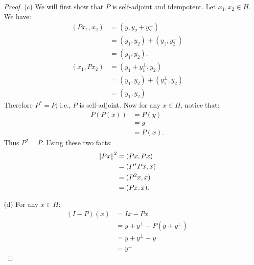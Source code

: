 \begin{proof}
        (c) We will first show that $P$ is self-adjoint and idempotent. Let $x_1,x_2 \in H$. We have:
            \begin{equation*}
            \begin{split}
                (Px_1,x_2)
                & = (y,y_2 + y_2^\perp) \\
                & = (y_1,y_2) + (y_1,y_2^\perp) \\
                & = (y_1,y_2). 
            \end{split}
            \end{equation*}
            \begin{equation*}
            \begin{split}
                (x_1,Px_2)
                & = (y_1 + y_1^\perp , y_2) \\
                & = (y_1,y_2) + (y_1^\perp, y_2) \\
                & = (y_1,y_2).
            \end{split}
            \end{equation*}
        Therefore $P^\ast = P$; i.e., $P$ is self-adjoint. Now for any $x \in H$, notice that:
            \begin{equation*}
            \begin{split}
                P(P(x))
                & = P(y) \\
                & = y \\
                & = P(x).
            \end{split}
            \end{equation*}
        Thus $P^2 = P$. Using these two facts:
            \begin{equation*}
            \begin{split}
                \left\lVert Px \right\rVert^2 
                & = (Px,Px) \\
                & = (P^\ast P x, x) \\
                & = (P^2x,x) \\
                & = (Px,x). \qedhere
            \end{split}
            \end{equation*}

        (d) For any $x \in H$:
            \begin{equation*}
            \begin{split}
                (I - P)(x) 
                & = Ix - Px \\
                & = y+y^\perp - P(y + y^\perp) \\
                & = y+y^\perp - y \\
                & = y^\perp
            \end{split}
            \end{equation*}
\end{proof}


